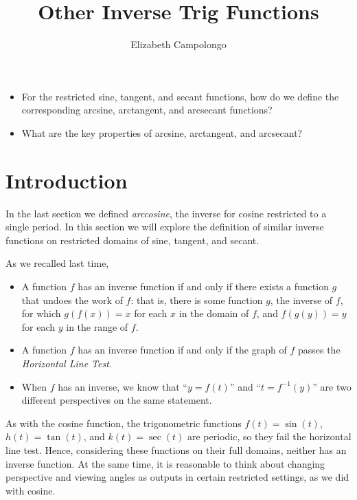 \documentclass{ximera}
\author{Elizabeth Campolongo}
\title{Other Inverse Trig Functions}
\begin{document}
\begin{abstract}
  
\end{abstract}
\maketitle



\begin{motivatingQuestions}\begin{itemize}
\item For the restricted sine, tangent, and secant functions, how do we define the corresponding arcsine, arctangent, and arcsecant functions?
\item What are the key properties of arcsine, arctangent, and arcsecant?
\end{itemize}\end{motivatingQuestions}






\section{Introduction}
In the last section we defined {\it arccosine}, the inverse for cosine restricted to a single period. In this section we will explore the definition of similar inverse functions on restricted domains of sine, tangent, and secant. 

As we recalled last time,
\begin{itemize}
\item
A function $f$ has an inverse function if and only if there exists a function $g$ that undoes the work of $f$: that is, there is some function $g$, the inverse of $f$, for which $g(f(x)) = x$ for each $x$ in the domain of $f$, and $f(g(y)) = y$ for each $y$ in the range of $f$. 
%
\item A function $f$ has an inverse function if and only if the graph of $f$ passes the {\it Horizontal Line Test}.
%
\item When $f$ has an inverse, we know that ``$y = f(t)$'' and ``$t = f^{-1}(y)$'' are two different perspectives on the same statement.
\end{itemize}
%
\par
As with the cosine function, the trigonometric functions $f(t) = \sin(t)$, $h(t) = \tan(t)$, and $k(t) = \sec(t)$ are periodic, so they fail the horizontal line test. Hence, considering these functions on their full domains, neither has an inverse function. At the same time, it is reasonable to think about changing perspective and viewing angles as outputs in certain restricted settings, as we did with cosine. 
\end{document}
